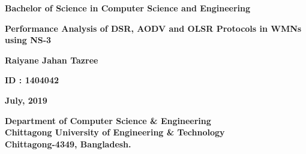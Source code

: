 \begin{center}
\textbf{{\large Bachelor of Science in Computer Science and Engineering}}
\end{center}

\vspace{75mm}

\begin{center}
\textbf{{\large Performance Analysis of DSR, AODV and OLSR Protocols in WMNs using NS-3} }
\end{center}

\vspace{25mm}
\begin{center}
\textbf{Raiyane Jahan Tazree}
\

\textbf{ID : 1404042}
\end{center}

\vspace{50mm}
\begin{center}
\textbf{July, 2019}
\end{center}

\vfill

\begin{center}
\textbf{{\large Department of Computer Science \& Engineering} \\
{\normalsize Chittagong University of Engineering \& Technology} \\
{\small Chittagong-4349, Bangladesh.}}
\end{center}